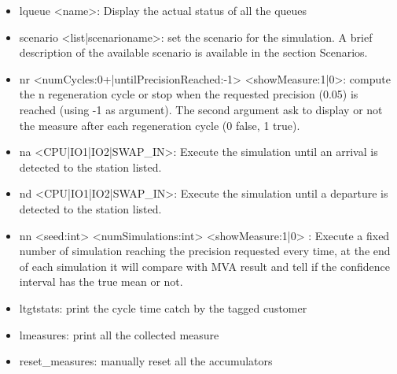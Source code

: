 \documentclass[12pt,a4paper]{article}
\begin{document}
\begin{itemize}
    \item lqueue <name>: Display the actual status of all the queues
    \item scenario <list|scenarioname>: set the scenario for the simulation. A brief description of the available scenario is available in the section Scenarios.
    \item nr <numCycles:0+|untilPrecisionReached:-1> <showMeasure:1|0>: compute the n regeneration cycle or stop when the requested precision (0.05) is reached (using -1 as argument). The second argument ask to display or not the measure after each regeneration cycle (0 false, 1 true).
    \item na <CPU|IO1|IO2|SWAP\_IN>: Execute the simulation until an arrival is detected to the station listed.
    \item nd <CPU|IO1|IO2|SWAP\_IN>: Execute the simulation until a departure is detected to the station listed.
    \item nn <seed:int> <numSimulations:int> <showMeasure:1|0> : Execute a fixed number of simulation reaching the precision requested every time, at the end of each simulation it will compare with MVA result and tell if the confidence interval has the true mean or not.
    \item ltgtstats: print the cycle time catch by the tagged customer
    \item lmeasures: print all the collected measure
    \item reset\_measures: manually reset all the accumulators

\end{itemize}
\end{document}
